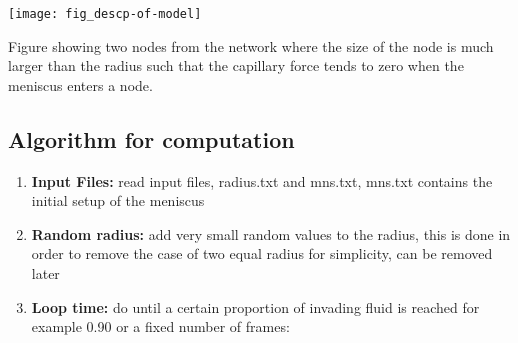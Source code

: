 	\texttt{[image: fig\_descp-of-model]}
	
	Figure showing two nodes from the network where the size of the node is much larger than the radius such that the capillary force tends to zero when the meniscus enters a node. 

\subsection{Algorithm for computation}
	\begin{enumerate}
		\item \textbf{Input Files:} read input files, radius.txt and mns.txt, mns.txt contains the initial setup of the meniscus
		\item \textbf{Random radius:} add very small random values to the radius, this is done in order to remove the case of two equal radius for simplicity, can be removed later
		\item \textbf{Loop time:} do until a certain proportion of invading fluid is reached for example 0.90 or a fixed number of frames:
		

\end{enumerate}
